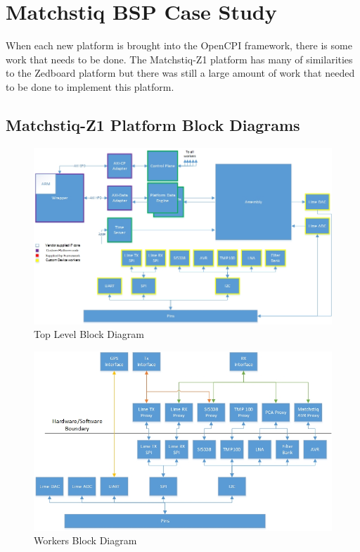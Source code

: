 \documentclass{article}
\begin{document}
\section*{Matchstiq BSP Case Study}
  When each new platform is brought into the OpenCPI framework, there is some work that needs to be done.  The Matchstiq-Z1 platform has many of similarities to the Zedboard platform but there was still a large amount of work that needed to be done to implement this platform.

  \subsection*{Matchstiq-Z1 Platform Block Diagrams}
    \begin{figure}[ht]
      \centerline{\includegraphics[scale=0.7]{matchstiq_BSP_toplevel}}
      \caption{Top Level Block Diagram}
      \label{fig:top}
    \end{figure}
    \vspace{65 mm}
    \begin{figure}[ht]
      \centerline{\includegraphics[scale=0.7]{matchstiq_BSP_worker}}
      \caption{Workers Block Diagram}
      \label{fig:top}
    \end{figure}
    \vspace{25 mm}
\end{document}
